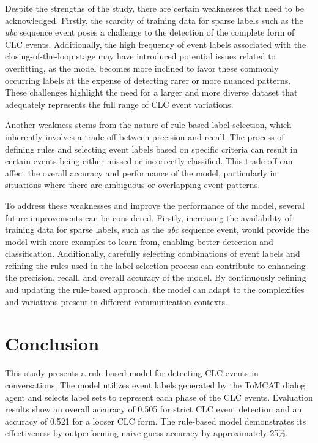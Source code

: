 \documentclass[11pt]{article}
\begin{document}
Despite the strengths of the study, there are certain weaknesses that need to be acknowledged. Firstly, the scarcity of training data for sparse labels such as the \textit{abc} sequence event poses a challenge to the detection of the complete form of CLC events. Additionally, the high frequency of event labels associated with the closing-of-the-loop stage may have introduced potential issues related to overfitting, as the model becomes more inclined to favor these commonly occurring labels at the expense of detecting rarer or more nuanced patterns. These challenges highlight the need for a larger and more diverse dataset that adequately represents the full range of CLC event variations.

Another weakness stems from the nature of rule-based label selection, which inherently involves a trade-off between precision and recall. The process of defining rules and selecting event labels based on specific criteria can result in certain events being either missed or incorrectly classified. This trade-off can affect the overall accuracy and performance of the model, particularly in situations where there are ambiguous or overlapping event patterns.

To address these weaknesses and improve the performance of the model, several future improvements can be considered. Firstly, increasing the availability of training data for sparse labels, such as the \textit{abc} sequence event, would provide the model with more examples to learn from, enabling better detection and classification. Additionally, carefully selecting combinations of event labels and refining the rules used in the label selection process can contribute to enhancing the precision, recall, and overall accuracy of the model. By continuously refining and updating the rule-based approach, the model can adapt to the complexities and variations present in different communication contexts.

\section{Conclusion}
This study presents a rule-based model for detecting CLC events in conversations. The model utilizes event labels generated by the ToMCAT dialog agent and selects label sets to represent each phase of the CLC events. Evaluation results show an overall accuracy of 0.505 for strict CLC event detection and an accuracy of 0.521 for a looser CLC form. The rule-based model demonstrates its effectiveness by outperforming naive guess accuracy by approximately 25\%.
\end{document}
